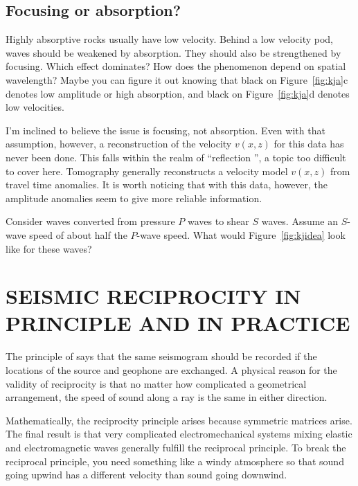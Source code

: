 \subsection{Focusing or absorption?}
\par
Highly absorptive rocks usually have low velocity.
Behind a low velocity pod, waves should be weakened by absorption.
They should also be strengthened by focusing.
Which effect dominates?
How does the phenomenon depend on spatial wavelength?
Maybe you can figure it out
knowing that black on Figure~\ref{fig:kja}c denotes
low amplitude or high absorption, and
black on Figure~\ref{fig:kja}d denotes low velocities.
\par
I'm inclined to believe the issue is focusing, not absorption.
Even with that assumption, however, a reconstruction of the velocity
$v(x,z)$
for this data has never been done.
This falls within the realm of ``reflection '',
a topic too difficult to cover here.
Tomography generally reconstructs a velocity model $v(x,z)$
from travel time anomalies.
It is worth noticing that with this data, however,
the amplitude anomalies seem to give more reliable information.


\begin{exer}

\item
Consider waves converted from pressure $P$ waves
to shear $S$ waves.
Assume an $S$-wave speed of about half the $P$-wave speed.
What would Figure~\ref{fig:kjidea} look like for these waves?
\end{exer}



\section{SEISMIC RECIPROCITY IN PRINCIPLE AND IN PRACTICE}
\par
The principle of  says
that the same seismogram should be recorded if the 
locations of the source and geophone are exchanged.
A physical reason for the validity of reciprocity is that no matter how
complicated a geometrical arrangement,
the speed of sound along a ray is the same in either direction.

\par
Mathematically, the reciprocity principle arises because
symmetric matrices arise.
The final result is that very complicated electromechanical systems mixing
elastic and electromagnetic waves generally fulfill the reciprocal principle.
To break the reciprocal principle,
you need something like a windy atmosphere so that sound
going upwind has a different velocity than sound going downwind.

